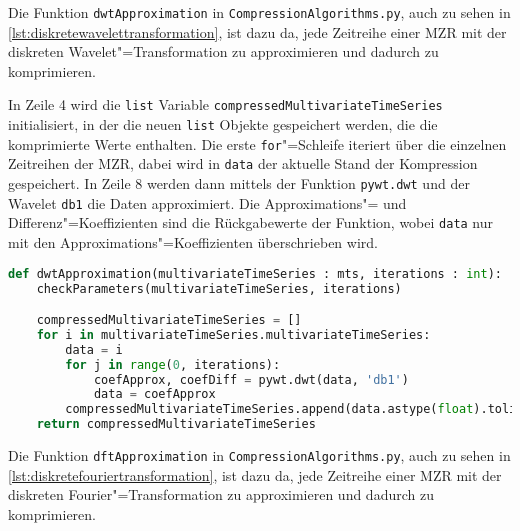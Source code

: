 Die Funktion \lstinline|dwtApproximation| in \texttt{CompressionAlgorithms.py}, auch zu sehen in \autoref{lst:diskretewavelettransformation}, ist dazu da, jede Zeitreihe einer \ac{MZR} mit der diskreten Wavelet"=Transformation zu approximieren und dadurch zu komprimieren.

In Zeile 4 wird die \lstinline|list| Variable \lstinline|compressedMultivariateTimeSeries| initialisiert, in der die neuen \lstinline|list| Objekte gespeichert werden, die die komprimierte Werte enthalten. Die erste \lstinline|for|"=Schleife iteriert über die einzelnen Zeitreihen der \ac{MZR}, dabei wird in \lstinline|data| der aktuelle Stand der Kompression gespeichert. In Zeile 8 werden dann mittels der Funktion \lstinline|pywt.dwt| und der Wavelet \lstinline|db1| die Daten approximiert. Die Approximations"= und Differenz"=Koeffizienten sind die Rückgabewerte der Funktion, wobei \lstinline|data| nur mit den Approximations"=Koeffizienten überschrieben wird.
\begin{lstlisting}[caption={Diskrete"=Wavelet"=Transformation}, label=lst:diskretewavelettransformation, style=Python, language=Python]
def dwtApproximation(multivariateTimeSeries : mts, iterations : int):
    checkParameters(multivariateTimeSeries, iterations)

    compressedMultivariateTimeSeries = []
    for i in multivariateTimeSeries.multivariateTimeSeries:
        data = i
        for j in range(0, iterations):
            coefApprox, coefDiff = pywt.dwt(data, 'db1')
            data = coefApprox
        compressedMultivariateTimeSeries.append(data.astype(float).tolist())
    return compressedMultivariateTimeSeries
\end{lstlisting}

Die Funktion \lstinline|dftApproximation| in \texttt{CompressionAlgorithms.py}, auch zu sehen in \autoref{lst:diskretefouriertransformation}, ist dazu da, jede Zeitreihe einer \ac{MZR} mit der diskreten Fourier"=Transformation zu approximieren und dadurch zu komprimieren.

